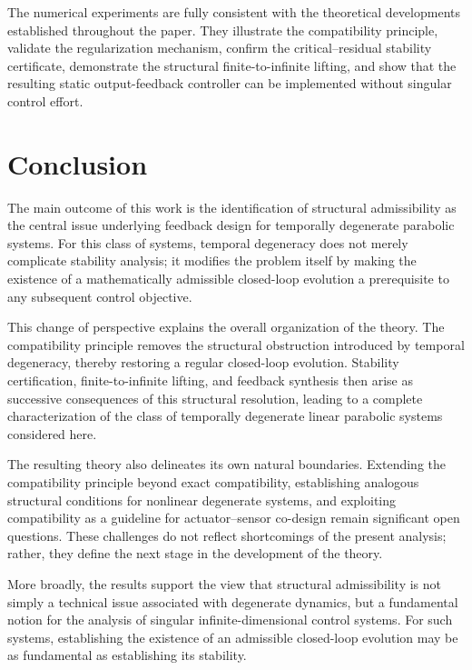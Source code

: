 \documentclass[pdflatex,sn-mathphys-num]{sn-jnl}
\theoremstyle{thmstyleone}%
\theoremstyle{thmstyletwo}%
\theoremstyle{thmstylethree}%
\begin{document}
The numerical experiments are fully consistent with the theoretical
developments established throughout the paper. They illustrate the
compatibility principle, validate the regularization mechanism, confirm the critical--residual stability certificate, demonstrate the structural finite-to-infinite lifting, and show that the resulting static output-feedback controller can be implemented without singular control effort.

\section{Conclusion}
\label{sec:conclusion}

The main outcome of this work is the identification of structural admissibility as the central issue underlying feedback design for temporally degenerate parabolic systems. For this class of systems, temporal degeneracy does not merely complicate stability analysis; it modifies the problem itself by making the existence of a mathematically admissible closed-loop evolution a prerequisite to any subsequent control objective.

This change of perspective explains the overall organization of the theory. The compatibility principle removes the structural obstruction introduced by temporal degeneracy, thereby restoring a regular closed-loop evolution. Stability certification, finite-to-infinite lifting, and feedback synthesis then arise as successive consequences of this structural resolution, leading to a complete characterization of the class of temporally degenerate linear parabolic systems considered here.

The resulting theory also delineates its own natural boundaries. Extending the compatibility principle beyond exact compatibility, establishing analogous structural conditions for nonlinear degenerate systems, and exploiting compatibility as a guideline for actuator--sensor co-design remain significant open questions. These challenges do not reflect shortcomings of the present analysis; rather, they define the next stage in the development of the theory.

More broadly, the results support the view that structural admissibility is not simply a technical issue associated with degenerate dynamics, but a fundamental notion for the analysis of singular infinite-dimensional control systems. For such systems, establishing the existence of an admissible closed-loop evolution may be as fundamental as establishing its stability.
\end{document}
